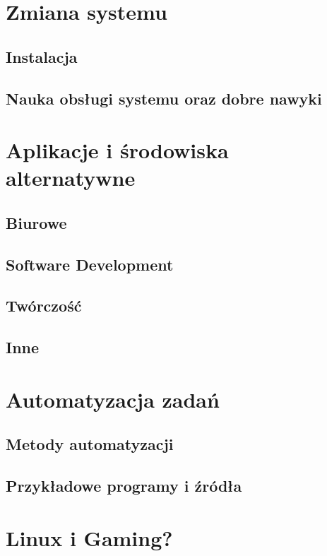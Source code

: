 \documentclass[10pt,a4paper]{report}
\begin{document}
\chapter{Zmiana systemu}


	\section{Instalacja}
	
	\section{Nauka obsługi systemu oraz dobre nawyki}
	
\chapter{Aplikacje i środowiska alternatywne}

	\section{Biurowe}
	
	\section{Software Development}
	
	\section{Twórczość}
	
	\section{Inne}
	
\chapter{Automatyzacja zadań}

	\section{Metody automatyzacji}
	
	\section{Przykładowe programy i źródła}
	
\chapter{Linux i Gaming?}
\end{document}
